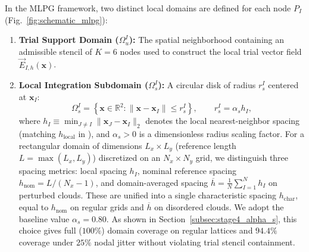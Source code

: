 \documentclass[VANCOUVER,Times1COL]{WileyNJD-v5}
\begin{document}
In the MLPG framework, two distinct local domains are defined for each node $P_I$ (Fig.~\ref{fig:schematic_mlpg}):
\begin{enumerate}
    \item \textbf{Trial Support Domain ($\Omega_u^I$):} The spatial neighborhood containing an admissible stencil of $K = 6$ nodes used to construct the local trial vector field $\vec{E}_{I,h}(\mathbf{x})$.
    \item \textbf{Local Integration Subdomain ($\Omega_s^I$):} A circular disk of radius $r_s^I$ centered at $\mathbf{x}_I$:
          \begin{equation}
              \Omega_s^I = \left\{ \mathbf{x} \in \mathbb{R}^2 : \|\mathbf{x} - \mathbf{x}_I\| \le r_s^I \right\}, \qquad r_s^I = \alpha_s h_I,
              \label{eq:subdomain_disk}
          \end{equation}
          where $h_I \equiv \min_{J \ne I} \|\mathbf{x}_J - \mathbf{x}_I\|_2$ denotes the local nearest-neighbor spacing (matching $h_{\mathrm{local}}$ in \cite{stable_vnmm2d_2026}), and $\alpha_s > 0$ is a dimensionless radius scaling factor. For a rectangular domain of dimensions $L_x \times L_y$ (reference length $L = \max(L_x, L_y)$) discretized on an $N_x \times N_y$ grid, we distinguish three spacing metrics: local spacing $h_I$, nominal reference spacing $h_{\mathrm{nom}} = L/(N_x - 1)$, and domain-averaged spacing $\overline{h} = \frac{1}{N}\sum_{I=1}^N h_I$ on perturbed clouds. These are unified into a single characteristic spacing $h_{\mathrm{char}}$, equal to $h_{\mathrm{nom}}$ on regular grids and $\overline{h}$ on disordered clouds. We adopt the baseline value $\alpha_s = 0.80$. As shown in Section~\ref{subsec:stage4_alpha_s}, this choice gives full ($100\%$) domain coverage on regular lattices and $94.4\%$ coverage under $25\%$ nodal jitter without violating trial stencil containment.
\end{enumerate}
\end{document}
